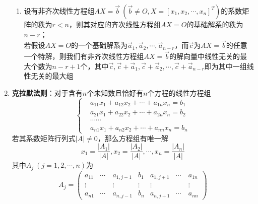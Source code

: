 \documentclass[12pt,a4paper,UTF8]{book}
\begin{document}
\begin{enumerate}
\begin{enumerate}
\item 设有非齐次线性方程组$AX=\vec{b}\ \left(\vec{b}\neq O,X=\left[x_1,x_2,\cdots,x_n\right]^T\right)$的系数矩阵的秩为$r<n$，则其对应的齐次线性方程组$AX=O$的基础解系的秩为$n-r$；\\
若假设$AX=O$的一个基础解系为$\vec{a}_1,\vec{a}_2,\cdots,\vec{a}_{n-r}$，而$\vec{c}$为$AX=\vec{b}$的任意一个特解，则我们有非齐次线性方程组$AX=\vec{b}$的解向量中线性无关的最大个数为$n-r+1$个，其中$\vec{c},\vec{c}+\vec{a}_1,\vec{c}+\vec{a}_2,\cdots,\vec{c}+\vec{a}_{n-r}$即为其中一组线性无关的最大组
\end{enumerate}
\item \textbf{克拉默法则}：对于含有$n$个未知数且恰好有$n$个方程的线性方程组
\[\left\{\begin{aligned}
&a_{11}x_1+a_{12}x_2+\cdots+a_{1n}x_n=b_1\\
&a_{21}x_1+a_{22}x_2+\cdots+a_{2n}x_n=b_2\\
&\cdots\cdots\\
&a_{n1}x_1+a_{n2}x_2+\cdots+a_{nn}x_n=b_n
\end{aligned}\right.\]
若其系数矩阵行列式$\left|A\right|\neq0$，那么方程组有唯一解
\[x_1=\frac{\left|A_1\right|}{\left|A\right|},x_2=\frac{\left|A_2\right|}{\left|A\right|},\cdots,x_n=\frac{\left|A_n\right|}{\left|A\right|}\]
其中$A_j\ \left(j=1,2,\cdots,n\right)$为
\[A_j=\begin{pmatrix}a_{11}&\cdots&a_{1,j-1}&b_1&a_{1,j+1}&\cdots&a_{1n}\\\vdots&\quad&\vdots&\vdots&\vdots&\quad&\vdots\\a_{n1}&\cdots&a_{n,j-1}&b_n&a_{n,j+1}&\cdots&a_{nn}\end{pmatrix}\]
\end{enumerate}
\end{document}
